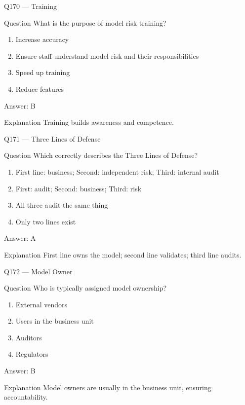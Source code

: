 \documentclass[aspectratio=169,8pt]{beamer}
\begin{document}
	\begin{frame}{Q170 --- Training}
		\begin{block}{Question}
			What is the purpose of model risk training?
		\end{block}
		\begin{enumerate}
			\item Increase accuracy
			\item Ensure staff understand model risk and their responsibilities
			\item Speed up training
			\item Reduce features
		\end{enumerate}
		\begin{exampleblock}{Answer: B}\end{exampleblock}
		\begin{block}{Explanation}
			Training builds awareness and competence.
		\end{block}
	\end{frame}
	
	\begin{frame}{Q171 --- Three Lines of Defense}
		\begin{block}{Question}
			Which correctly describes the Three Lines of Defense?
		\end{block}
		\begin{enumerate}
			\item First line: business; Second: independent risk; Third: internal audit
			\item First: audit; Second: business; Third: risk
			\item All three audit the same thing
			\item Only two lines exist
		\end{enumerate}
		\begin{exampleblock}{Answer: A}\end{exampleblock}
		\begin{block}{Explanation}
			First line owns the model; second line validates; third line audits.
		\end{block}
	\end{frame}
	
	\begin{frame}{Q172 --- Model Owner}
		\begin{block}{Question}
			Who is typically assigned model ownership?
		\end{block}
		\begin{enumerate}
			\item External vendors
			\item Users in the business unit
			\item Auditors
			\item Regulators
		\end{enumerate}
		\begin{exampleblock}{Answer: B}\end{exampleblock}
		\begin{block}{Explanation}
			Model owners are usually in the business unit, ensuring accountability.
		\end{block}
	\end{frame}
	
\end{document}
